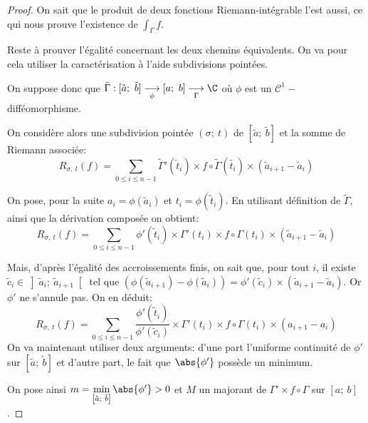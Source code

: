 \begin{proof}
On sait que le produit de deux fonctions Riemann-intégrable l'est aussi, ce qui nous prouve l'existence de $\displaystyle{\int_{\Gamma}} f$.

Reste à prouver l'égalité concernant les deux chemins équivalents. On va pour cela utiliser la caractérisation à l'aide subdivisions pointées.

On suppose donc que $\tilde{\Gamma}: [\tilde{a};~\tilde{b}] \underset{\phi}{\longrightarrow} [a;~b] \underset{\Gamma}{\longrightarrow} \C$ où $\phi$ est un $\mathcal{C}^1-$difféomorphisme.

On considère alors une subdivision pointée $(\sigma;~t)$ de $[\tilde{a};~\tilde{b}]$ et la somme de Riemann associée:
\[
R_{\sigma,~t}(f) = \displaystyle{\sum \limits_{0 \leq i \leq n-1}} \tilde{\Gamma}'\left(\tilde{t}_i\right) \times f\circ \tilde{\Gamma}\left(\tilde{t_i}\right) \times \left(\tilde{a}_{i+1}-\tilde{a}_i\right)
\]

On pose, pour la suite $a_i = \phi\left(\tilde{a}_i\right)$ et $t_i = \phi\left(\tilde{t}_i\right)$. En utilisant définition de $\tilde{\Gamma}$, ainsi que la dérivation composée on obtient:
\[
R_{\sigma,~t}(f) = \displaystyle{\sum \limits_{0 \leq i \leq n-1}} \phi'\left(\tilde{t}_i\right) \times \Gamma'(t_i) \times f\circ \Gamma(t_i) \times \left(\tilde{a}_{i+1}-\tilde{a}_i\right)
\]

Mais, d'après l'égalité des accroissements finis, on sait que, pour tout $i$, il existe $\tilde{c}_i \in \left]\tilde{a}_i;~\tilde{a}_{i+1}\right[$ tel que $\left(\phi\left(\tilde{a}_{i+1}\right)-\phi\left(\tilde{a}_i\right)\right) = \phi'\left (\tilde{c}_i\right ) \times \left (\tilde{a}_{i+1}-\tilde{a}_i\right )$. Or $\phi'$ ne s'annule pas. On en déduit:
\[
R_{\sigma,~t}(f) = \displaystyle{\sum \limits_{0 \leq i \leq n-1}} \dfrac{\phi'\left(\tilde{t}_i\right)}{\phi'\left(\tilde{c}_i\right)} \times \Gamma'(t_i) \times f\circ \Gamma(t_i) \times \left(a_{i+1}-a_i\right)
\]
On va maintenant utiliser deux arguments: d'une part l'uniforme continuité de $\phi'$ sur $\left [\tilde{a};~\tilde{b}\right ]$ et d'autre part, le fait que $\abs{\phi'}$ possède un minimum. 

On pose ainsi $m = \min \limits_{\left [\tilde{a};~\tilde{b}\right ]} \abs{\phi'}>0$ et $M$ un majorant de $\Gamma' \times f \circ \Gamma$ sur $[a;~b]$.


\end{proof}

